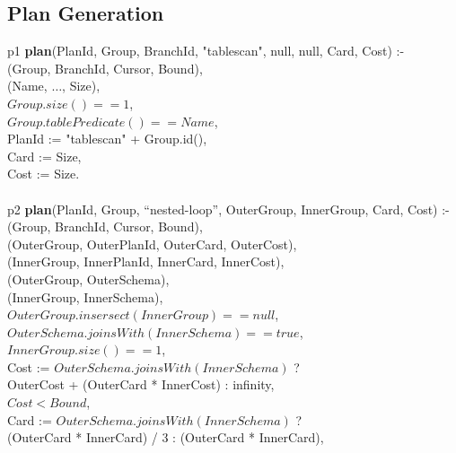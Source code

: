 \subsection{Plan Generation}
\label{ch:opt:sec:cascades_plan}

\begin{figure*}
\ssp
\centering
\begin{boxedminipage}{\linewidth}
p1 {\bf plan}(PlanId, Group, BranchId, "tablescan", null, null, Card, Cost) :- \\
(Group, BranchId, Cursor, Bound), \\
(Name, $\ldots$, Size), \\
\datalogspace $Group.size() == 1$, \\
\datalogspace $Group.tablePredicate() == Name$, \\
\datalogspace PlanId := "tablescan" + Group.id(), \\
\datalogspace Card := Size, \\
\datalogspace Cost := Size. \\
\\
p2 {\bf plan}(PlanId, Group, ``nested-loop'', OuterGroup, InnerGroup, Card, Cost) :- \\
(Group, BranchId, Cursor, Bound), \\
(OuterGroup, OuterPlanId, OuterCard, OuterCost), \\
(InnerGroup, InnerPlanId, InnerCard, InnerCost), \\
(OuterGroup, OuterSchema), \\
(InnerGroup, InnerSchema), \\
\datalogspace $OuterGroup.insersect(InnerGroup) ==  null$, \\
\datalogspace $OuterSchema.joinsWith(InnerSchema) ==  true$, \\
\datalogspace $InnerGroup.size() == 1$, \\
\datalogspace Cost := $OuterSchema.joinsWith(InnerSchema)$ ? \\
\datalogspace \datalogspace OuterCost + (OuterCard * InnerCost) : infinity, \\
\datalogspace $Cost < Bound$, \\
\datalogspace Card := $OuterSchema.joinsWith(InnerSchema)$ ? \\
\datalogspace \datalogspace (OuterCard * InnerCard) / 3 : (OuterCard * InnerCard), \\

\end{boxedminipage}
\end{figure*}
